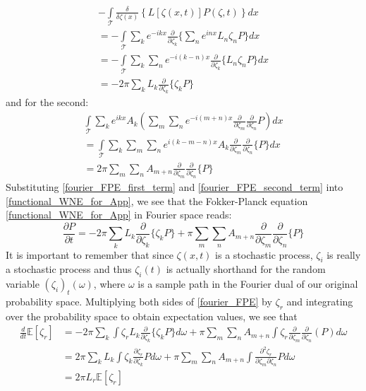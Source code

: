 \begin{gather}
-\int\limits_{\mathcal{T}}\frac{\delta}{\delta \zeta(x)}\left\{L[\zeta(x,t)]P(\zeta,t)\right\}dx\nonumber\\
= -\int\limits_{\mathcal{T}}\sum\limits_{k}e^{-ikx}\frac{\partial}{\partial \zeta_k}\{\sum\limits_{n}e^{inx}L_n\zeta_nP\}dx\nonumber\\
= -\int\limits_{\mathcal{T}}\sum\limits_{k}\sum\limits_{n}e^{-i(k-n)x}\frac{\partial}{\partial \zeta_k}\{L_n\zeta_nP\}dx\nonumber\\
= -2\pi\sum\limits_{k}L_{k}\frac{\partial}{\partial \zeta_k}\{\zeta_kP\}\label{fourier_FPE_first_term}
\end{gather}
and for the second:
\begin{gather}
\int\limits_{\mathcal{T}}\sum\limits_{k}e^{ikx}A_k\left(\sum\limits_{m}\sum\limits_{n}e^{-i(m+n)x}\frac{\partial}{\partial \zeta_m}\frac{\partial}{\partial \zeta_n}P\right)dx\nonumber\\
= \int\limits_{\mathcal{T}}\sum\limits_{k}\sum\limits_{m}\sum\limits_{n}e^{i(k-m-n)x}A_k\frac{\partial}{\partial \zeta_m}\frac{\partial}{\partial \zeta_n}\{P\}dx\nonumber\\
= 2\pi\sum\limits_{m}\sum\limits_{n}A_{m+n}\frac{\partial}{\partial \zeta_m}\frac{\partial}{\partial \zeta_{n}}\{P\}\label{fourier_FPE_second_term}
\end{gather}
Substituting \eqref{fourier_FPE_first_term} and \eqref{fourier_FPE_second_term} into \eqref{functional_WNE_for_App}, we see that the Fokker-Planck equation \eqref{functional_WNE_for_App} in Fourier space reads:
\begin{equation}
\label{fourier_FPE}
\frac{\partial P}{\partial t} = -2\pi\sum\limits_{k}L_{k}\frac{\partial}{\partial \zeta_k}\{\zeta_kP\} + \pi\sum\limits_{m}\sum\limits_{n}A_{m+n}\frac{\partial}{\partial \zeta_m}\frac{\partial}{\partial \zeta_{n}}\{P\}
\end{equation}
It is important to remember that since $\zeta(x,t)$ is a stochastic process, $\zeta_i$ is really a stochastic process and thus $\zeta_i(t)$ is actually shorthand for the random variable $(\zeta_i)_{t}(\omega)$, where $\omega$ is a sample path in the Fourier dual of our original probability space. Multiplying both sides of \eqref{fourier_FPE} by $\zeta_r$ and integrating over the probability space to obtain expectation values, we see that
\begin{align}
\frac{d}{dt}\mathbb{E}[\zeta_r] &= - 2\pi \sum\limits_{k}\int\zeta_rL_k\frac{\partial}{\partial \zeta_k}\{\zeta_k P\}d\omega + \pi\sum\limits_{m}\sum\limits_{n}A_{m+n}\int\zeta_r\frac{\partial}{\partial \zeta_m}\frac{\partial}{\partial \zeta_{n}}(P)d\omega\nonumber\\
&=  2\pi \sum\limits_{k}L_k\int\zeta_k\frac{\partial \zeta_r}{\partial \zeta_k}Pd\omega + \pi\sum\limits_{m}\sum\limits_{n}A_{m+n}\int\frac{\partial^2 \zeta_r}{\partial \zeta_m\partial \zeta_{n}}Pd\omega\nonumber\\
&=  2\pi L_{r}\mathbb{E}[\zeta_r]\label{fourier_mode_mean}
\end{align}
